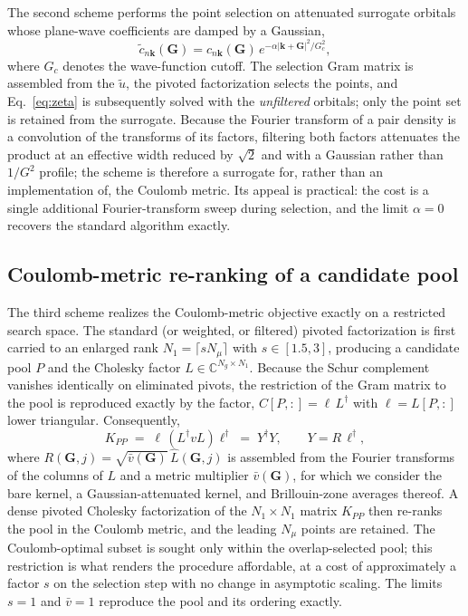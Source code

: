 \documentclass[aps,prb,twocolumn,superscriptaddress,amsmath,amssymb]{revtex4-2}
\newcommand{\Nmu}{N_\mu}
\newcommand{\GG}{\mathbf{G}}
\newcommand{\kk}{\mathbf{k}}
\begin{document}
The second scheme performs the point selection on attenuated surrogate
orbitals whose plane-wave coefficients are damped by a Gaussian,
\begin{equation}
  \tilde c_{n\kk}(\GG) = c_{n\kk}(\GG)\,
  e^{-\alpha |\kk+\GG|^{2} / G_c^{2}},
  \label{eq:filter}
\end{equation}
where $G_c$ denotes the wave-function cutoff. The selection Gram matrix is
assembled from the $\tilde u$, the pivoted factorization selects the
points, and Eq.~\eqref{eq:zeta} is subsequently solved with the
\emph{unfiltered} orbitals; only the point set is retained from the
surrogate. Because the Fourier transform of a pair density is a convolution
of the transforms of its factors, filtering both factors attenuates the
product at an effective width reduced by $\sqrt{2}$ and with a Gaussian
rather than $1/G^{2}$ profile; the scheme is therefore a surrogate for,
rather than an implementation of, the Coulomb metric. Its appeal is
practical: the cost is a single additional Fourier-transform sweep during
selection, and the limit $\alpha = 0$ recovers the standard algorithm
exactly.

\subsection{Coulomb-metric re-ranking of a candidate pool}
\label{sec:knob3}

The third scheme realizes the Coulomb-metric objective exactly on a
restricted search space. The standard (or weighted, or filtered) pivoted
factorization is first carried to an enlarged rank
$N_1 = \lceil s \Nmu \rceil$ with $s \in [1.5,3]$, producing a candidate
pool $P$ and the Cholesky factor $L \in \mathbb{C}^{N_g\times N_1}$.
Because the Schur complement vanishes identically on eliminated pivots, the
restriction of the Gram matrix to the pool is reproduced exactly by the
factor, $C[P,:] = \ell\, L^{\dagger}$ with $\ell = L[P,:]$ lower
triangular. Consequently,
\begin{equation}
  K_{PP} \;=\; \ell\, \left(L^{\dagger} v L\right) \ell^{\dagger}
        \;=\; Y^{\dagger} Y,
  \qquad Y = R\,\ell^{\dagger},
  \label{eq:KPP}
\end{equation}
where $R(\GG,j) = \sqrt{\bar v(\GG)}\, \hat L(\GG,j)$ is assembled from the
Fourier transforms of the columns of $L$ and a metric multiplier
$\bar v(\GG)$, for which we consider the bare kernel, a Gaussian-attenuated
kernel, and Brillouin-zone averages thereof. A dense pivoted Cholesky
factorization of the $N_1 \times N_1$ matrix $K_{PP}$ then re-ranks the
pool in the Coulomb metric, and the leading $\Nmu$ points are retained.
The Coulomb-optimal subset is sought only within the overlap-selected pool;
this restriction is what renders the procedure affordable, at a cost of
approximately a factor $s$ on the selection step with no change in
asymptotic scaling. The limits $s = 1$ and $\bar v = 1$ reproduce the
pool and its ordering exactly.
\end{document}
